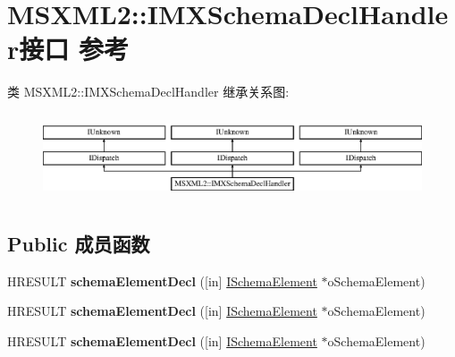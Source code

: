 \hypertarget{interface_m_s_x_m_l2_1_1_i_m_x_schema_decl_handler}{}\section{M\+S\+X\+M\+L2\+:\+:I\+M\+X\+Schema\+Decl\+Handler接口 参考}
\label{interface_m_s_x_m_l2_1_1_i_m_x_schema_decl_handler}
类 M\+S\+X\+M\+L2\+:\+:I\+M\+X\+Schema\+Decl\+Handler 继承关系图\+:\begin{figure}[H]
\begin{center}
\leavevmode
\includegraphics[height=2.568807cm]{interface_m_s_x_m_l2_1_1_i_m_x_schema_decl_handler}
\end{center}
\end{figure}
\subsection*{Public 成员函数}
\begin{DoxyCompactItemize}
\item 
\mbox{\label{interface_m_s_x_m_l2_1_1_i_m_x_schema_decl_handler_ac516f33c7187d3904918eecb1bf12f1e}} 
H\+R\+E\+S\+U\+LT {\bfseries schema\+Element\+Decl} (\mbox{[}in\mbox{]} \hyperlink{interface_m_s_x_m_l2_1_1_i_schema_element}{I\+Schema\+Element} $\ast$o\+Schema\+Element)
\item 
\mbox{\label{interface_m_s_x_m_l2_1_1_i_m_x_schema_decl_handler_ac516f33c7187d3904918eecb1bf12f1e}} 
H\+R\+E\+S\+U\+LT {\bfseries schema\+Element\+Decl} (\mbox{[}in\mbox{]} \hyperlink{interface_m_s_x_m_l2_1_1_i_schema_element}{I\+Schema\+Element} $\ast$o\+Schema\+Element)
\item 
\mbox{\label{interface_m_s_x_m_l2_1_1_i_m_x_schema_decl_handler_ac516f33c7187d3904918eecb1bf12f1e}} 
H\+R\+E\+S\+U\+LT {\bfseries schema\+Element\+Decl} (\mbox{[}in\mbox{]} \hyperlink{interface_m_s_x_m_l2_1_1_i_schema_element}{I\+Schema\+Element} $\ast$o\+Schema\+Element)
\end{DoxyCompactItemize}
